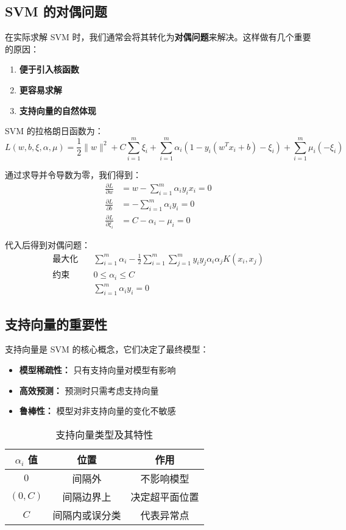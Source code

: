 \documentclass{article}
\begin{document}
\subsection*{SVM 的对偶问题}
在实际求解 SVM 时，我们通常会将其转化为\textbf{对偶问题}来解决。这样做有几个重要的原因：
\begin{enumerate}
    \item \textbf{便于引入核函数}
    \item \textbf{更容易求解}
    \item \textbf{支持向量的自然体现}
\end{enumerate}

SVM 的拉格朗日函数为：
$$L(w, b, \xi, \alpha, \mu) = \frac{1}{2} \|w\|^2 + C \sum_{i=1}^{m} \xi_i + \sum_{i=1}^{m} \alpha_i (1 - y_i(w^T x_i + b) - \xi_i) + \sum_{i=1}^{m} \mu_i (-\xi_i)$$

通过求导并令导数为零，我们得到：
\begin{align*}
    \frac{\partial L}{\partial w} &= w - \sum_{i=1}^{m} \alpha_i y_i x_i = 0 \\
    \frac{\partial L}{\partial b} &= -\sum_{i=1}^{m} \alpha_i y_i = 0 \\
    \frac{\partial L}{\partial \xi_i} &= C - \alpha_i - \mu_i = 0
\end{align*}

代入后得到对偶问题：
\begin{align*}
\text{最大化} \quad & \sum_{i=1}^{m} \alpha_i - \frac{1}{2} \sum_{i=1}^{m} \sum_{j=1}^{m} y_i y_j \alpha_i \alpha_j K(x_i, x_j) \\
\text{约束} \quad & 0 \le \alpha_i \le C \\
& \sum_{i=1}^{m} \alpha_i y_i = 0
\end{align*}

\subsection*{支持向量的重要性}
支持向量是 SVM 的核心概念，它们决定了最终模型：
\begin{itemize}
    \item \textbf{模型稀疏性：} 只有支持向量对模型有影响
    \item \textbf{高效预测：} 预测时只需考虑支持向量
    \item \textbf{鲁棒性：} 模型对非支持向量的变化不敏感
\end{itemize}

\begin{table}[h]
\centering
\caption{支持向量类型及其特性}
\label{tab:sv_types}
\begin{tabular}{c|c|c}
\toprule
$\alpha_i$ 值 & 位置 & 作用 \\
\midrule
$0$ & 间隔外 & 不影响模型 \\
$(0, C)$ & 间隔边界上 & 决定超平面位置 \\
$C$ & 间隔内或误分类 & 代表异常点 \\
\bottomrule
\end{tabular}
\end{table}
\end{document}
